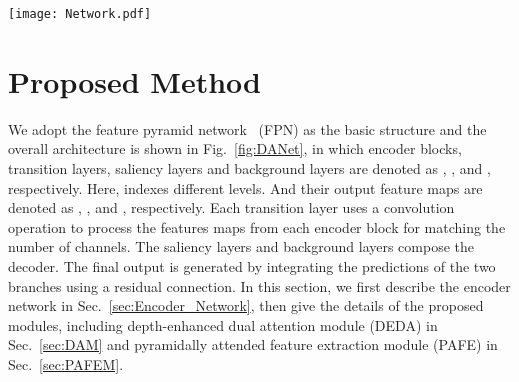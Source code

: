 \documentclass[runningheads]{llncs}
\begin{document}
\begin{figure*}
    \texttt{[image: Network.pdf]}\\ \centering
    \caption{Network pipeline. It consists of the VGG-16 (), five transition layers (), five saliency layers (), five background layers (), the pyramidally attended feature extraction module (PAFE) and  the depth-enhanced dual attention module (DEDA). The final prediction is generated by using residual connections to fuse the outputs from   and .} 		
    \label{fig:DANet}
\end{figure*} 

\section{Proposed Method}
We adopt the feature pyramid network~\cite{FPN} (FPN) as the basic structure and the overall architecture is shown in Fig.~\ref{fig:DANet}, in which encoder blocks, transition layers, saliency layers and background layers are denoted as , ,  and , respectively. Here,  indexes different levels. And their output feature maps are denoted as , ,  and , respectively. Each transition layer uses a  convolution operation to process the features maps from each encoder block for matching the number of channels. The saliency layers and background layers compose the decoder. The final output is generated by integrating the predictions of the two branches using a residual connection. In this section, we first describe the encoder network in Sec.~\ref{sec:Encoder_Network}, then give the details of the proposed modules, including depth-enhanced dual attention module (DEDA) in Sec.~\ref{sec:DAM} and pyramidally attended feature extraction module (PAFE)  in Sec.~\ref{sec:PAFEM}.  
\end{document}
